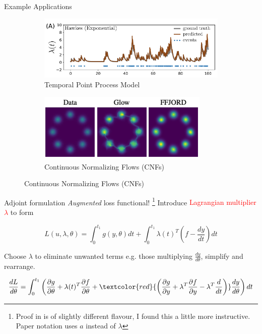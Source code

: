 \documentclass{beamer}
\begin{document}
\begin{frame}{Example Applications}
\begin{figure}
      \begin{subfigure}[t]{.45\textwidth}
        \centering
        \includegraphics[width=.75\linewidth]{slides_20231201/figures/jia_hawkes.png}
        \caption{Temporal Point Process Model \cite{jia_neural_2020}}
      \end{subfigure}
      \qquad
      \begin{subfigure}[t]{.45\textwidth}
        \centering
        \includegraphics[width=.7\linewidth]{slides_20231201/figures/chen_cnf_2.png}
        \caption{Continuous Normalizing Flows (CNFs) \cite{grathwohl_ffjord:_2018}}
      \end{subfigure}
    \end{figure}
\end{frame}

\begin{frame}{Adjoint formulation}
    \emph{Augmented} loss functional! \footnote{Proof in \cite{chen_neural_2020} is of slightly different flavour, I found this a little more instructive. Paper notation uses $a$ instead of $\lambda$} Introduce \textcolor{red}{Lagrangian multiplier $\lambda$} to form
    
    $$L(u, \lambda, \theta) = \int_{0}^{t_1} g(y, \theta) dt + \int_{0}^{t_1}\lambda(t)^T \left( f - \frac{dy}{dt}\right) dt$$
    
    Choose $\lambda$ to eliminate unwanted terms e.g. those multiplying $\frac{dy}{d\theta}$, simplify and rearrange.

    $$\frac{dL}{d\theta} = \int_{0}^{t_1} \left(\frac{\partial g}{\partial \theta} + \lambda(t)^T \frac{\partial f}{\partial \theta} +   \textcolor{red}{\left( \frac{\partial g}{\partial y} + \lambda^T \frac{\partial f}{\partial y} - \lambda^T \frac{d}{dt}\right)} \frac{dy}{d\theta}\right)dt$$
\end{frame}
\end{document}
